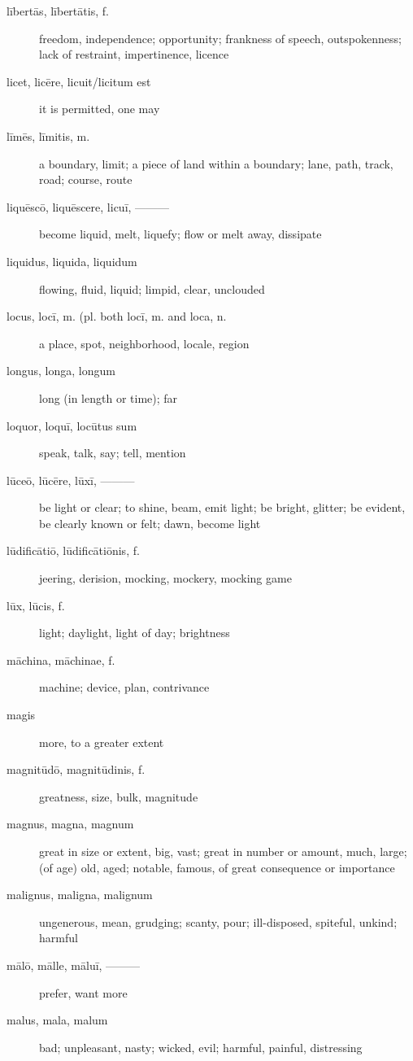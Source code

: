 \begin{description}
    \item[lībertās, lībertātis, f.] \marginnote{*}freedom, independence; opportunity; frankness of speech, outspokenness; lack of restraint, impertinence, licence
    \item[licet, licēre, licuit/licitum est] \marginnote{*}it is permitted, one may
    \item[līmēs, līmitis, m.] a boundary, limit; a piece of land within a boundary; lane, path, track, road; course, route
    \item[liquēscō, liquēscere, licuī, ———] become liquid, melt, liquefy; flow or melt away, dissipate
    \item[liquidus, liquida, liquidum] flowing, fluid, liquid; limpid, clear, unclouded
    \item[locus, locī, m. (pl. both locī, m. and loca, n.] \marginnote{*}a place, spot, neighborhood, locale, region
    \item[longus, longa, longum] \marginnote{*}long (in length or time); far
    \item[loquor, loquī, locūtus sum] \marginnote{*}speak, talk, say; tell, mention
    \item[lūceō, lūcēre, lūxī, ———] be light or clear; to shine, beam, emit light; be bright, glitter; be evident, be clearly known or felt; dawn, become light
    \item[lūdificātiō, lūdificātiōnis, f.] jeering, derision, mocking, mockery, mocking game
    \item[lūx, lūcis, f.] \marginnote{*}light; daylight, light of day; brightness
    \item[māchina, māchinae, f.] machine; device, plan, contrivance
    \item[magis] \marginnote{*}more, to a greater extent
    \item[magnitūdō, magnitūdinis, f.] \marginnote{*}greatness, size, bulk, magnitude
    \item[magnus, magna, magnum] \marginnote{*}great in size or extent, big, vast; great in number or amount, much, large; (of age) old, aged; notable, famous, of great consequence or importance
    \item[malignus, maligna, malignum] ungenerous, mean, grudging; scanty, pour; ill-disposed, spiteful, unkind; harmful
    \item[mālō, mālle, māluī, ———] \marginnote{*}prefer, want more
    \item[malus, mala, malum] \marginnote{*}bad; unpleasant, nasty; wicked, evil; harmful, painful, distressing

\end{description}
